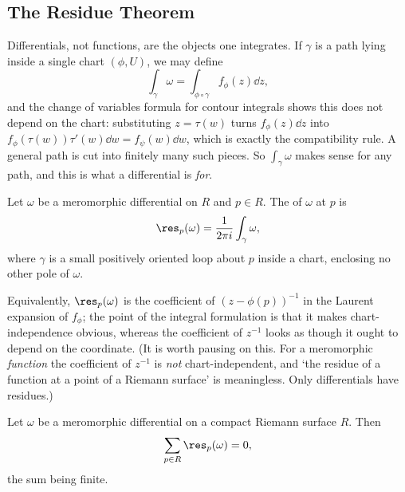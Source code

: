 \subsection{The Residue Theorem}

Differentials, not functions, are the objects one integrates. If $\gamma$ is a path lying
inside a single chart $(\phi, U)$, we may define
$$
\int_\gamma \omega = \int_{\phi\circ\gamma} f_\phi(z)\dd z,
$$
and the change of variables formula for contour integrals shows this does not depend on
the chart: substituting $z = \tau(w)$ turns $f_\phi(z)\dd z$ into
$f_\phi(\tau(w))\tau'(w)\dd w = f_\psi(w)\dd w$, which is exactly the compatibility rule.
A general path is cut into finitely many such pieces. So $\int_\gamma\omega$ makes sense
for any path, and this is what a differential is \emph{for}.

\begin{definition}[Residue]
	Let $\omega$ be a meromorphic differential on $R$ and $p \in R$. The 
	of $\omega$ at $p$ is
	$$
	\res_p(\omega) = \frac{1}{2\pi i}\int_\gamma \omega,
	$$
	where $\gamma$ is a small positively oriented loop about $p$ inside a chart, enclosing
	no other pole of $\omega$.
\end{definition}

Equivalently, $\res_p(\omega)$ is the coefficient of $(z - \phi(p))^{-1}$ in the Laurent
expansion of $f_\phi$; the point of the integral formulation is that it makes
chart-independence obvious, whereas the coefficient of $z^{-1}$ looks as though it ought
to depend on the coordinate. (It is worth pausing on this. For a meromorphic
\emph{function} the coefficient of $z^{-1}$ is \emph{not} chart-independent, and `the
residue of a function at a point of a Riemann surface' is meaningless. Only differentials
have residues.)

\begin{theorem}\label{thm:residuesum}
	Let $\omega$ be a meromorphic differential on a compact Riemann surface $R$. Then
	$$
	\sum_{p \in R}\res_p(\omega) = 0,
	$$
	the sum being finite.
\end{theorem}

